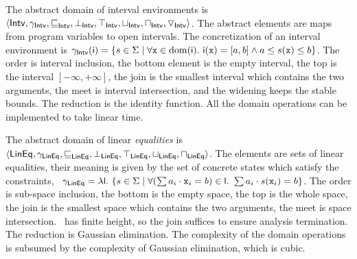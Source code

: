\documentclass{llncs}
\begin{document}


The abstract domain of interval environments is $\langle \mathsf{Intv}, \gamma_{\mathsf{Intv}},\allowbreak {\ensuremath{\sqsubseteq}}_{\mathsf{Intv}}, {\bot}_{\mathsf{Intv}}, \allowbreak {\ensuremath{\top}}_{\mathsf{Intv}}, {\sqcup}_{\mathsf{Intv}}, {\sqcap}_{\mathsf{Intv}}, \triangledown_{\mathsf{Intv}} \rangle$.
The abstract elements are maps from program variables to open intervals. 
The concretization of an interval environment  is $\gamma_{\mathsf{Intv}}(\mathsf{\mathsf{i}}) = \{ s \in \Sigma \mid \forall \mathtt{x} \in \mathrm{dom}(\mathsf{\mathsf{i}}).\ \mathsf{\mathsf{i}}(\mathtt{x}) = [a, b] \wedge  a \leq s(\mathtt{x}) \leq b\}$.
The order is interval inclusion, the bottom element is the empty
interval, the top is the interval $[-\infty, +\infty]$, the join is the smallest interval
which contains the two arguments, the meet is interval intersection,
and the widening keeps the stable bounds.
The reduction is the identity function.
All the domain operations can be implemented to take linear time. 


The abstract domain of linear \emph{equalities}  is $\langle \mathsf{LinEq}, \gamma_{\mathsf{LinEq}},\allowbreak {\ensuremath{\sqsubseteq}}_{\mathsf{LinEq}}, {\bot}_{\mathsf{LinEq}}, \allowbreak {\ensuremath{\top}}_{\mathsf{LinEq}}, {\sqcup}_{\mathsf{LinEq}}, {\sqcap}_{\mathsf{LinEq}} \rangle$.
The elements are sets of linear equalities, their meaning is given by the set of concrete states which satisfy the constraints, \ie\ $\gamma_{\mathsf{LinEq}} = \lambda \mathsf{\mathsf{l}}.\ \{ s \in \Sigma \mid \forall (\sum a_i \cdot \mathtt{x}_i = b) \in \mathsf{\mathsf{l}}.\ \sum a_i \cdot s(\mathtt{x}_i) = b  \} $.
The order is sub-space inclusion, the bottom is the empty space, the top is the whole space, the join is the smallest space which contains the two arguments,  the meet is space intersection.
\Karr\ has finite height, so  the join suffices to ensure analysis termination.
The reduction is Gaussian elimination.
The complexity of the domain operations is subsumed by the complexity of Gaussian elimination, which is cubic.
\end{document}
